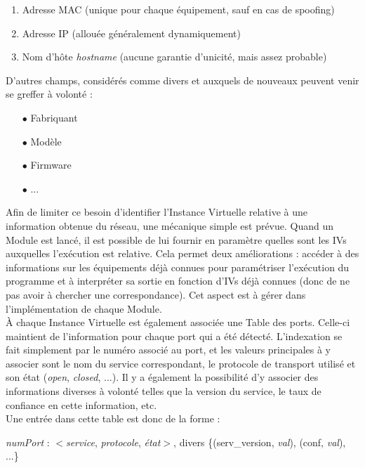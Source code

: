 \documentclass[]{article}
\begin{document}
\begin{enumerate}
\item Adresse MAC (unique pour chaque équipement, sauf en cas de spoofing)
\item Adresse IP (allouée généralement dynamiquement)
\item Nom d'hôte \textit{hostname} (aucune garantie d'unicité, mais assez probable)
\end{enumerate}

\vspace{0.1cm}

D'autres champs, considérés comme divers et auxquels de nouveaux peuvent venir se greffer à volonté :

\begin{itemize}
\item[$\bullet$] Fabriquant
\item[$\bullet$] Modèle
\item[$\bullet$] Firmware
\item[$\bullet$] ...
\end{itemize}

\vspace{0.4cm}

Afin de limiter ce besoin d'identifier l'Instance Virtuelle relative à une information obtenue du réseau, une mécanique simple est prévue. Quand un Module est lancé, il est possible de lui fournir en paramètre quelles sont les IVs auxquelles l'exécution est relative. Cela permet deux améliorations : accéder à des informations sur les équipements déjà connues pour paramétriser l'exécution du programme et à interpréter sa sortie en fonction d'IVs déjà connues (donc de ne pas avoir à chercher une correspondance). Cet aspect est à gérer dans l'implémentation de chaque Module.\\  

À chaque Instance Virtuelle est également associée une Table des ports. Celle-ci maintient de l'information pour chaque port qui a été détecté. L'indexation se fait simplement par le numéro associé au port, et les valeurs principales à y associer sont le nom du service correspondant, le protocole de transport utilisé et son état (\textit{open}, \textit{closed}, ...). Il y a également la possibilité d'y associer des informations diverses à volonté telles que la version du service, le taux de confiance en cette information, etc.\\

\indent Une entrée dans cette table est donc de la forme :
\begin{center}
\textit{numPort} : $<$\textit{service}, \textit{protocole}, \textit{état}$>$, divers \{(serv\_version, \textit{val}), (conf, \textit{val}), ...\}
\end{center}
\end{document}
